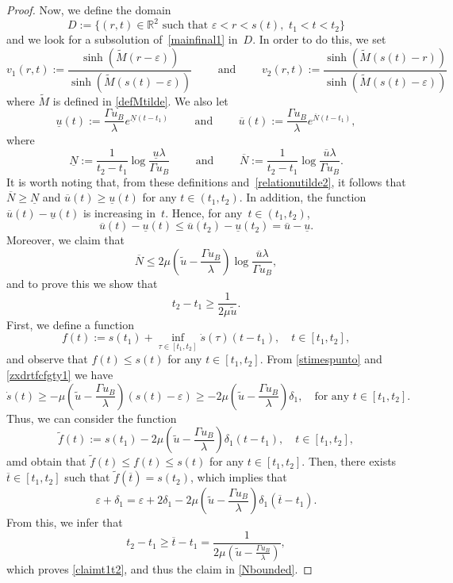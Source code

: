 \documentclass[12pt,a4paper,intlimits,sumlimits]{amsart}
\def \R {\mathbb{R}}
\theoremstyle{definition}
\theoremstyle{plain}
\numberwithin{equation}{section}
\renewcommand{\leq}{\leqslant}
\renewcommand{\geq}{\geqslant}
\begin{document}
\begin{proof}
Now, we define the domain 
\[
D:=\big\{(r,t)\in \R^2 \mbox{ such that } \varepsilon<r<s(t),\,\, t_1<t<t_2\big\}
\]
and we look for a subsolution of~\eqref{mainfinal1} in~$D$. In order to do this, we set 
\[
v_1(r,t):=\frac{\sinh(\widetilde M(r-\varepsilon))}{\sinh( \widetilde M(s(t)-\varepsilon))}\qquad \mbox{ and }\qquad v_2(r,t):=\frac{\sinh(\widetilde M(s(t)-r))}{\sinh( \widetilde M(s(t)-\varepsilon))}
\]
where $\widetilde M$ is defined in \eqref{defMtilde}. We also let
\[
\underline{u}(t):=\frac{\Gamma u_B}{\lambda} e^{\underline{N} (t-t_1)} \qquad \mbox{ and }\qquad \overline{u}(t):=\frac{\Gamma u_B}{\lambda} e^{\overline{N} (t-t_1)},
\]
where
\[
\underline{N}:=\frac{1}{t_2-t_1}\log\frac{\underline{u}\lambda}{\Gamma u_B}\qquad \mbox{ and }\qquad \overline{N}:=\frac{1}{t_2-t_1}\log\frac{\overline{u}\lambda}{\Gamma u_B}.
\]
It is worth noting that, from these definitions and~\eqref{relationutilde2}, it follows that $\overline{N}\geq \underline{N}$ and $\overline{u}(t)\geq \underline{u}(t)$ for any $t\in (t_1,t_2)$. In addition, the function~$\overline{u}(t)- \underline{u}(t)$ is increasing in~$t$. Hence, for any~$t\in (t_1,t_2)$,
\begin{equation}\label{xdftygvbnj}
\overline{u}(t)- \underline{u}(t)\leq \overline{u}(t_2)- \underline{u}(t_2)=\overline{u}- \underline{u}.
\end{equation}
Moreover, we claim that
\begin{equation}\label{Nbounded}
\overline N\leq 2\mu\left(\widetilde u-\frac{\Gamma u_B}{\lambda} \right) \log\frac{\overline{u}\lambda}{\Gamma u_B},
\end{equation}
and to prove this we show that
\begin{equation}\label{claimt1t2}
t_2-t_1\geq \frac{1}{2\mu \widetilde u}.
\end{equation}
First, we define a function
\[
f(t):=s(t_1)+\inf_{\tau\in[t_1,t_2]}\dot s(\tau)(t-t_1), \quad t\in[t_1,t_2],
\]
and observe that $f(t)\leq s(t)$ for any $t\in[t_1,t_2]$.
From \eqref{stimespunto} and \eqref{zxdrtfcfgty1} we have
\[
\dot s(t)\geq -\mu\left(\widetilde u-\frac{\Gamma u_B}{\lambda} \right) (s(t)-\varepsilon)\geq -2\mu\left(\widetilde u-\frac{\Gamma u_B}{\lambda} \right) \delta_1, \quad \mbox{for any }t\in[t_1,t_2].
\]
Thus, we can consider the function
\[
\widetilde f(t):=s(t_1)-2\mu\left(\widetilde u-\frac{\Gamma u_B}{\lambda} \right) \delta_1(t-t_1), \quad t\in[t_1,t_2],
\]
amd obtain that $\widetilde f(t)\leq f(t)\leq s(t)$ for any $t\in[t_1,t_2]$. Then, there exists $\overline t \in [t_1,t_2]$ such that $\widetilde f(\overline t)=s(t_2)$, which implies that
\[
\varepsilon+\delta_1=\varepsilon+2\delta_1-2\mu\left(\widetilde u-\frac{\Gamma u_B}{\lambda} \right) \delta_1(\overline t-t_1).
\]
From this, we infer that
\[
t_2-t_1\geq \overline t-t_1=\frac{1}{2\mu\left(\widetilde u-\frac{\Gamma u_B}{\lambda} \right)},
\]
which proves \eqref{claimt1t2}, and thus the claim in \eqref{Nbounded}.


\end{proof}
\end{document}
